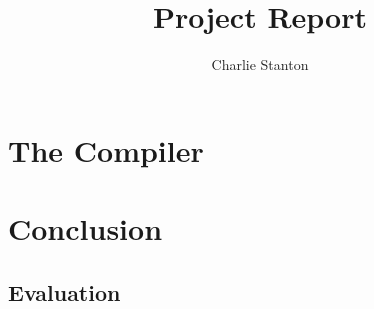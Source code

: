 \documentclass[12pt,a4paper,titlepage]{article}
\title{Project Report}
\author{Charlie Stanton}
\begin{document}
    \maketitle

    

    

    

    \section{The Compiler}

    \section{Conclusion}

    \subsection{Evaluation}

    
    
\end{document}
